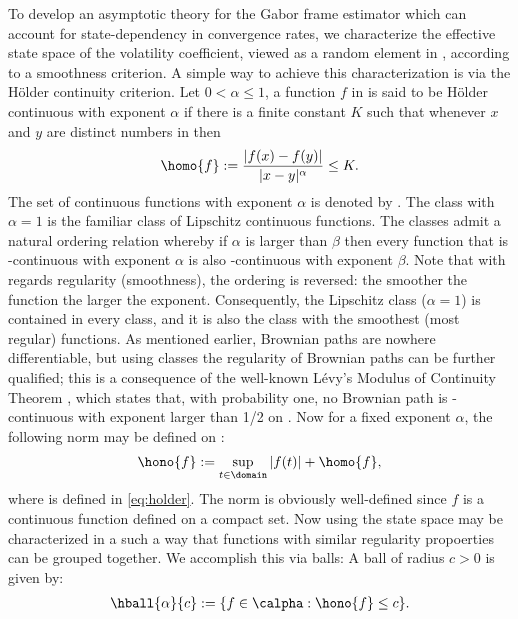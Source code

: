 To develop an asymptotic theory for the Gabor frame estimator which can account for state-dependency in convergence rates, we characterize the effective  state space of the volatility coefficient, viewed as a random element in \state, according to a smoothness criterion.
A simple way to achieve this characterization is via the H\"older continuity criterion. Let $0 < \alpha \le 1$, a function $f$ in \state is said to be H\"older continuous with exponent $\alpha$ if  there is a finite constant $K$ such that whenever $x$ and $y$ are distinct numbers in \domain then 
\begin{align}
  \homo{f} := \frac{\vert f(x) - f(y)\vert}{\vert x - y \vert^\alpha} \le K. 
  \label{eq:holder}
\end{align}
The set of \holder continuous functions with exponent $\alpha$ is denoted by \calpha. The \holder class with $\alpha = 1$ is the familiar class of Lipschitz continuous functions. The \holder classes admit a natural ordering relation whereby if $\alpha$ is larger than  $\beta$ then every function that is \holder-continuous with exponent $\alpha$ is also  \holder-continuous with exponent $\beta$. Note that with regards regularity (smoothness), the ordering is reversed: the smoother the function the larger the \holder exponent. Consequently, the Lipschitz class ($ \alpha = 1$) is contained in every \holder class, and it is also the class with the smoothest (most regular) functions. As mentioned earlier, Brownian paths are nowhere differentiable, but using \holder classes the regularity of Brownian paths can be further qualified; this is a consequence of  the well-known L\'evy's Modulus of Continuity Theorem \citep[Theorem I.10.2]{Williams2000}, which states that, with probability one, no Brownian path is \holder-continuous with exponent larger than 1/2 on \domain.   
Now for a fixed exponent $\alpha$, the following norm may be defined on \calpha:
\begin{align}
  \hono{f} := \sup_{t \in \domain} |f(t)| + \homo{f},\notag
  \label{}
\end{align}
where  is defined in \eqref{eq:holder}. The norm is obviously well-defined since $f$ is a continuous function defined on a compact set. Now using \hono{\cdot}  the state space may be characterized in a such a way that functions with similar regularity propoerties can be grouped together. We accomplish this via \holder balls: A \holder ball  of radius $c > 0$ is given by:
\begin{align}
  \hball{\alpha}{c}  := \{f \in \calpha : \hono{f} \le c\}.\notag
  \label{}
\end{align}

